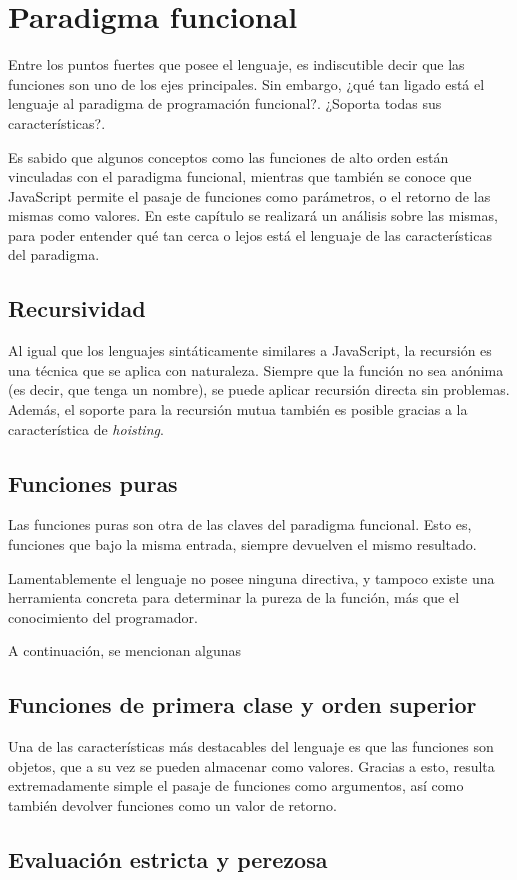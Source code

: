 \chapter{Paradigma funcional}

\label{Chapter3}


Entre los puntos fuertes que posee el lenguaje, es indiscutible decir que las funciones son uno de los ejes principales. Sin embargo, ¿qué tan ligado está el lenguaje al paradigma de programación funcional?. ¿Soporta todas sus características?.

Es sabido que algunos conceptos como las funciones de alto orden están vinculadas con el paradigma funcional, mientras que también se conoce que JavaScript permite el pasaje de funciones como parámetros, o el retorno de las mismas como valores. En este capítulo se realizará un análisis sobre las mismas, para poder entender qué tan cerca o lejos está el lenguaje de las características del paradigma.


\section{Recursividad}

Al igual que los lenguajes sintáticamente similares a JavaScript, la recursión es una técnica que se aplica con naturaleza. Siempre que la función no sea anónima (es decir, que tenga un nombre), se puede aplicar recursión directa sin problemas. Además, el soporte para la recursión mutua también es posible gracias a la característica de \textit{hoisting}.

\section{Funciones puras}

Las funciones puras son otra de las claves del paradigma funcional. Esto es, funciones que bajo la misma entrada, siempre devuelven el mismo resultado.

Lamentablemente el lenguaje no posee ninguna directiva, y tampoco existe una herramienta concreta para determinar la pureza de la función, más que el conocimiento del programador.

A continuación, se mencionan algunas


\section{Funciones de primera clase y orden superior}

Una de las características más destacables del lenguaje es que las funciones son objetos, que a su vez se pueden almacenar como valores. Gracias a esto, resulta extremadamente simple el pasaje de funciones como argumentos, así como también devolver funciones como un valor de retorno.

\section{Evaluación estricta y perezosa}